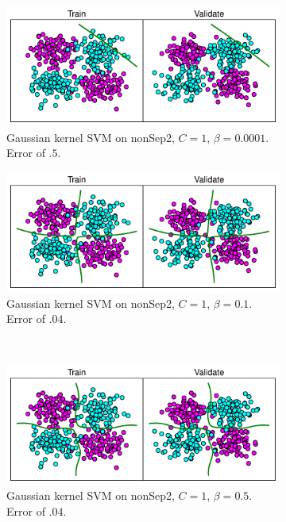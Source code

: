 \documentclass[10pt]{article}
\begin{document}
\begin{figure}[!ht]
\begin{subfigure}[t]{0.46\textwidth}
	\centering
	\includegraphics[width=.8\textwidth]{1-3-nonSep2-1-0_0001-gaussian-REAL.pdf}
	\caption{Gaussian kernel SVM on nonSep2, $C = 1$, $\beta = 0.0001$. Error of $.5$.}
	\label{fig:1-3-gaussian-small-beta}
\end{subfigure}
\begin{subfigure}[t]{0.46\textwidth}
	\centering
	\includegraphics[width=.8\textwidth]{1-3-nonSep2-1-0_1-gaussian-REAL.pdf}
	\caption{Gaussian kernel SVM on nonSep2, $C = 1$, $\beta = 0.1$. Error of $.04$.}
	\label{fig:1-3-gaussian-larger-beta}
\end{subfigure}
\\
\begin{subfigure}[t]{0.46\textwidth}
	\centering
	\includegraphics[width=.8\textwidth]{1-3-nonSep2-1-0_5-gaussian-REAL.pdf}
	\caption{Gaussian kernel SVM on nonSep2, $C = 1$, $\beta = 0.5$. Error of $.04$.}
	\label{fig:1-3-gaussian-small-beta2}
\end{subfigure}
\begin{subfigure}[t]{0.46\textwidth}

\end{subfigure}
\end{figure}
\end{document}
